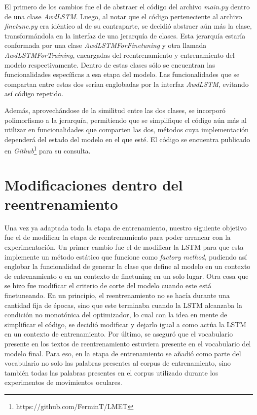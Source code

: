 El primero de los cambios fue el de abstraer el código del archivo \textit{main.py} dentro de una clase \textit{AwdLSTM}. Luego, al notar que el código perteneciente al archivo \textit{finetune.py} era idéntico al de su contraparte, se decidió abstraer aún más la clase, transformándola en la interfaz de una jerarquía de clases. Esta jerarquía estaría conformada por una clase \textit{AwdLSTMForFinetuning} y otra llamada \textit{AwdLSTMForTraining}, encargadas del reentrenamiento y entrenamiento del modelo respectivamente. Dentro de estas clases sólo se encuentran las funcionalidades específicas a esa etapa del modelo. Las funcionalidades que se compartan entre estas dos serían englobadas por la interfaz \textit{AwdLSTM}, evitando así código repetido.

Además, aprovechándose de la similitud entre las dos clases, se incorporó polimorfismo a la jerarquía, permitiendo que se simplifique el código aún más al utilizar en funcionalidades que comparten las dos, métodos cuya implementación dependerá del estado del modelo en el que esté. El código se encuentra publicado en \textit{Github}\footnote{https://github.com/FerminT/LMET} para su consulta.

\section{Modificaciones dentro del reentrenamiento}

Una vez ya adaptada toda la etapa de entrenamiento, nuestro siguiente objetivo fue el de modificar la etapa de reentrenamiento para poder arrancar con la experimentación.  Un primer cambio fue el de modificar la LSTM para que esta implemente un método estático que funcione como \textit{factory method}, pudiendo así englobar la funcionalidad de generar la clase que define al modelo en un contexto de entrenamiento o en un contexto de finetuning en un solo lugar.
Otra cosa que se hizo fue modificar el criterio de corte del modelo cuando este está finetuneando. En un principio, el reentrenamiento no se hacía durante una cantidad fija de épocas, sino que este terminaba cuando la LSTM alcanzaba la condición no monotónica del optimizador, lo cual con la idea en mente de simplificar el código, se decidió modificar y dejarlo igual a como actúa la LSTM en un contexto de entrenamiento.
Por último, se aseguró que el vocabulario presente en los textos de reentrenamiento estuviera presente en el vocabulario del modelo final. Para eso, en la etapa de entrenamiento se añadió como parte del vocabulario no solo las palabras presentes al corpus de entrenamiento, sino también todas las palabras presentes en el corpus utilizado durante los experimentos de movimientos oculares.



